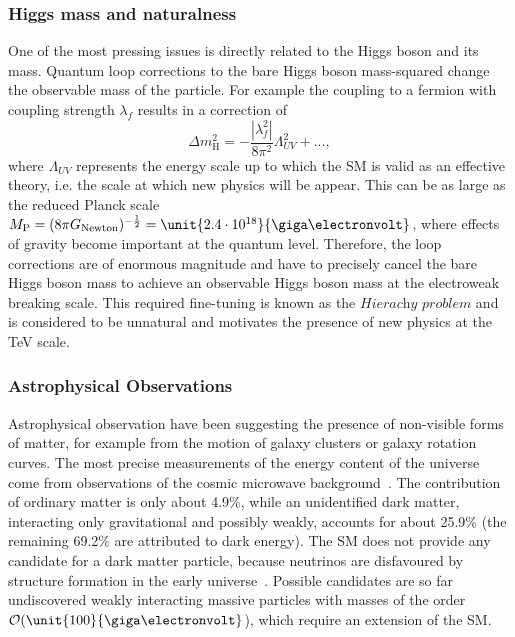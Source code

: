 \subsubsection*{Higgs mass and naturalness}
One of the most pressing issues is directly related to the Higgs boson and its mass. Quantum loop corrections to the bare Higgs boson mass-squared change the observable mass of the particle. For example the coupling to a fermion with coupling strength $\lambda_f$ results in a correction of
\begin{equation}
\Delta m_{\mathrm{H}}^2 = -\frac{|\lambda_f^2|}{8\pi^2}\Lambda_{UV}^2 + ...,
\end{equation}
where $\Lambda_{UV}$ represents the energy scale up to which the SM is valid as an effective theory, i.e. the scale at which new physics will be appear. This can be as large as the reduced Planck scale $M_\mathrm{P} = (8\pi G_{\mathrm{Newton}})^{-\frac{1}{2}} = \unit{2.4\cdot 10^{18}}{\giga\electronvolt}$, where effects of gravity become important at the quantum level. Therefore, the loop corrections are of enormous magnitude and have to precisely cancel the bare Higgs boson mass to achieve an observable Higgs boson mass at the electroweak breaking scale. This required fine-tuning is known as the  $\textit{Hierachy problem}$ and is considered to be unnatural and motivates the presence of new physics at the TeV scale.

\subsubsection*{Astrophysical Observations}
Astrophysical observation have been suggesting the presence of non-visible forms of matter, for example from the motion of galaxy clusters or galaxy rotation curves. The most precise measurements of the energy content of the universe come from observations of the cosmic microwave background~\cite{Adam:2015rua}. The contribution of ordinary matter is only about 4.9\%, while an unidentified dark matter, interacting only gravitational and possibly weakly, accounts for about 25.9\% (the remaining 69.2\% are attributed to dark energy). The SM does not provide any candidate for a dark matter particle, because neutrinos are disfavoured by structure formation in the early universe~\cite{PDG}. Possible candidates are so far undiscovered weakly interacting massive particles with masses of the order $\mathcal{O}(\unit{100}{\giga\electronvolt}$), which require an extension of the SM. 

